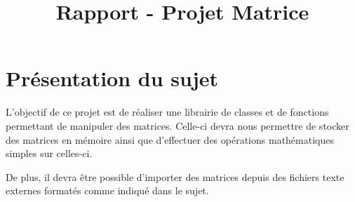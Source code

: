
\title{Rapport - Projet Matrice}
\fancyhf{}
\lhead{\leftmark}


	\maketitle
	\tableofcontents
	\chapter{Présentation du sujet}
		L'objectif de ce projet est de réaliser une librairie de classes et de fonctions permettant de manipuler des matrices. Celle-ci devra nous permettre de stocker des matrices en mémoire ainsi que d'effectuer des opérations mathématiques simples sur celles-ci.
		
		De plus, il devra être possible d'importer des matrices depuis des fichiers texte externes formatés comme indiqué dans le sujet.
	
